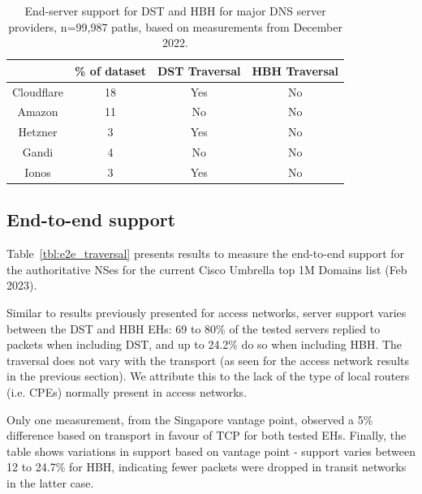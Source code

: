 \documentclass[conference]{IEEEtran}
\begin{document}
\begin{table} 
\begin{tabular}{c|c|c|c}
           & \% of dataset &  DST Traversal & HBH Traversal\\
\hline
Cloudflare & 18                      & Yes                & No                 \\
\hline
Amazon     & 11                     & No                 & No                 \\
\hline
Hetzner    & 3                     & Yes                & No                 \\
\hline
Gandi      & 4                     & No                 & No                 \\
\hline
Ionos      & 3                    & Yes                & No                
\end{tabular}
\label{tbl:provider_support}
\caption{End-server support for DST and HBH for major DNS server providers, n=99,987 paths, based on measurements from December 2022. 
}
\end{table}

\subsection{End-to-end support}
\label{subsec:e2esupport}

Table~\ref{tbl:e2e_traversal} presents results to measure the end-to-end support for the authoritative NSes for the current Cisco Umbrella top 1M Domains list (Feb 2023).

Similar to results previously presented for access networks, server support varies between the DST and HBH EHs: 69 to 80\% of the tested servers replied to packets when including DST, and up to 24.2\% do so when including HBH. The traversal does not vary with the transport (as seen for the access network results in the previous section). We attribute this to the lack of the type of local routers (i.e. CPEs) normally present in access networks. 

Only one measurement, from the Singapore vantage point, observed a 5\% difference based on transport in favour of TCP for both tested EHs.
Finally, the table shows variations in support based on vantage point - support varies between 12 to 24.7\% for HBH, indicating fewer packets were dropped in transit networks in the latter case.
\end{document}
